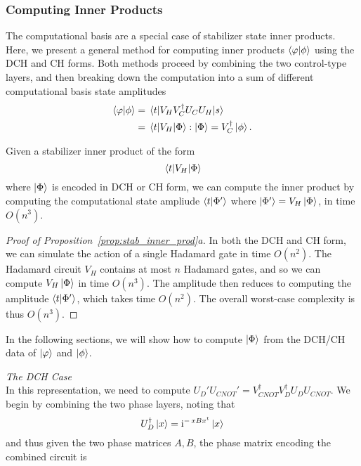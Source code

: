 \subsubsection*{Computing Inner Products}
The computational basis are a special case of stabilizer state inner products. Here, we present a general method for computing inner products $\braket{\varphi}{\phi}$ using the DCH and CH forms. Both methods proceed by combining the two control-type layers, and then breaking down the computation into a sum of different computational basis state amplitudes
\begin{align*}
\braket{\varphi}{\phi} &= \matrixel{t}{V_{H}V_{C}^{\dagger}U_{C}U_{H}}{s} \\
&= \matrixel{t}{V_{H}}{\Phi} : \ket{\Phi} = V_{C}^{\dagger} \ket{\phi}.
\end{align*}
\begin{prop}
Given a stabilizer inner product of the form
\[\matrixel{t}{V_{H}}{\Phi}\]
where $\ket{\Phi}$ is encoded in DCH or CH form, we can compute the inner product by computing the computational state ampliude $\braket{t}{\Phi'}$ where $\ket{\Phi'}=V_{H}\ket{\Phi}$, in time $O(n^{3})$.\label{prop:stab_inner_prod}
\end{prop}
\begin{proof}[Proof of Proposition~\ref{prop:stab_inner_prod}a]
In both the DCH and CH form, we can simulate the action of a single Hadamard gate in time $O(n^{2})$. The Hadamard circuit $V_{H}$ contains at most $n$ Hadamard gates, and so we can compute $V_{H}\ket{\Phi}$ in time $O(n^{3})$. The amplitude then reduces to computing the amplitude $\braket{t}{\Phi'}$, which takes time $O(n^{2})$. The overall worst-case complexity is thus $O(n^{3})$.
\end{proof}
In the following sections, we will show how to compute $\ket{\Phi}$ from the DCH/CH data of $\ket{\varphi}$ and $\ket{\phi}$.\par
\large{\itshape{The DCH Case}}\\
In this representation, we need to compute $U_{D}'U_{CNOT}'=V_{CNOT}^{\dagger}V_{D}^{\dagger}U_{D}U_{CNOT}$. We begin by combining the two phase layers, noting that
\[U_{D}^{\dagger}\ket{x} = \mathrm{i}^{-\,xBx^{t}}\ket{x}\]
and thus given the two phase matrices $A,B$, the phase matrix encoding the combined circuit is

